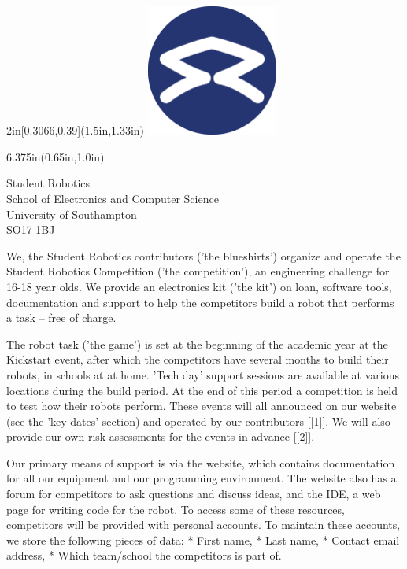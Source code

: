 \documentclass[a4paper]{article}
\begin{document}
\begin{textblock*}{2in}[0.3066,0.39](1.5in,1.33in)
    \includegraphics[width=1.7in]{sr-logo.pdf}
\end{textblock*}
\begin{textblock*}{6.375in}(0.65in,1.0in)
    \sffamily
    \begin{flushright}
    \sffamily \Huge \color{SRblue}
    Student Robotics\\ \large
    \smallskip
    School of Electronics and Computer Science\\
    University of Southampton\\
    SO17 1BJ
    \end{flushright}
\end{textblock*}
\color{black}
\vspace*{0.4in}

We, the Student Robotics contributors ('the blueshirts') organize and
operate the Student Robotics Competition ('the competition'), an
engineering challenge for 16-18 year olds. We provide an electronics kit
('the kit') on loan, software tools, documentation and support to help
the competitors build a robot that performs a task -- free of charge.

The robot task ('the game') is set at the beginning of the academic year
at the Kickstart event, after which the competitors have several months
to build their robots, in schools at at home. 'Tech day' support
sessions are available at various locations during the build period. At
the end of this period a competition is held to test how their robots
perform. These events will all announced on our website (see the 'key
dates' section) and operated by our contributors [[1]]. We will also
provide our own risk assessments for the events in advance [[2]].

Our primary means of support is via the website, which contains
documentation for all our equipment and our programming environment. The
website also has a forum for competitors to ask questions and discuss
ideas, and the IDE, a web page for writing code for the robot. To access
some of these resources, competitors will be provided with personal
accounts. To maintain these accounts, we store the following pieces of data:
 * First name,
 * Last name,
 * Contact email address,
 * Which team/school the competitors is part of.
\end{document}
